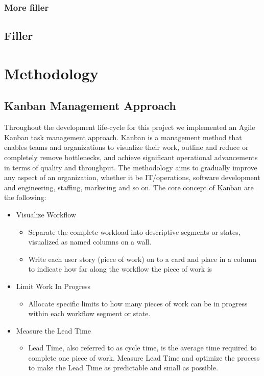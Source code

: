 \subsection{More filler}


\section{Filler}


\chapter{Methodology}
\section{Kanban Management Approach}
Throughout the development life-cycle for this project we implemented an Agile Kanban task management approach. Kanban is a management method that enables teams and organizations to visualize their work, outline and reduce or completely remove bottlenecks, and achieve significant operational advancements in terms of quality and throughput\cite{kanban}. The methodology aims to gradually improve any aspect of an organization, whether it be IT/operations, software development and engineering, staffing, marketing and so on. The core concept of Kanban are the following:
\begin{itemize}
\item Visualize Workflow
	\begin{itemize}
	\item Separate the complete workload into descriptive segments or states, visualized as named columns on a wall.
    \item Write each user story (piece of work) on to a card and place in a column to indicate how far along the workflow the piece of work is
  	\end{itemize}
\item Limit Work In Progress
	\begin{itemize}
	\item Allocate specific limits to how many pieces of work can be in progress within each workflow segment or state.
	\end{itemize}
\item Measure the Lead Time
	\begin{itemize}
	\item Lead Time, also referred to as cycle time, is the average time required to complete one piece of work. Measure Lead Time and optimize the process to make the Lead Time as predictable and small as possible.
	\end{itemize}
\end{itemize}

